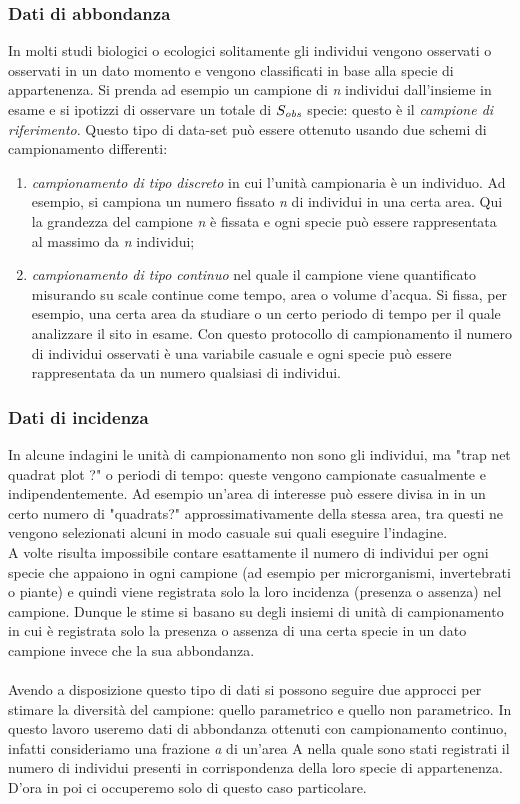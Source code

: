\subsubsection{Dati di abbondanza}
In molti studi biologici o ecologici solitamente gli individui vengono osservati o osservati in un dato momento e vengono classificati in base alla specie di appartenenza. Si prenda ad esempio un campione di \emph{n} individui dall'insieme in esame e si ipotizzi di osservare un totale di $S_\emph{obs}$ specie: questo è il \emph{campione di riferimento}. Questo tipo di data-set può essere ottenuto usando due schemi di campionamento differenti:
\begin{enumerate}
    \item \emph{campionamento di tipo discreto} in cui l'unità campionaria è un individuo. Ad esempio, si campiona un numero fissato \emph{n} di individui in una certa area. Qui la grandezza del campione \emph{n} è fissata e ogni specie può essere rappresentata al massimo da \emph{n} individui;
    
    \item \emph{campionamento di tipo continuo} nel quale il campione viene quantificato misurando su scale continue come tempo, area o volume d'acqua.
    Si fissa, per esempio, una certa area da studiare o un certo periodo di tempo per il quale analizzare il sito in esame. Con questo protocollo di campionamento il numero di individui osservati è una variabile casuale e ogni specie può essere rappresentata da un numero qualsiasi di individui.
\end{enumerate}

\subsubsection{Dati di incidenza}
In alcune indagini le unità di campionamento non sono gli individui, ma "trap net quadrat plot ?" o periodi di tempo: queste vengono campionate casualmente e indipendentemente. Ad esempio un'area di interesse può essere divisa in in un certo numero di "quadrats?" approssimativamente della stessa area, tra questi ne vengono selezionati alcuni in modo casuale sui quali eseguire l'indagine.\\
A volte risulta impossibile contare esattamente il numero di individui per ogni specie che appaiono in ogni campione (ad esempio per microrganismi, invertebrati o piante) e quindi viene registrata solo la loro incidenza (presenza o assenza) nel campione. Dunque le stime si basano su degli insiemi di unità di campionamento in cui è registrata solo la presenza o assenza di una certa specie in un dato campione invece che la sua abbondanza.
\\ \\
Avendo a disposizione questo tipo di dati si possono seguire due approcci per stimare la diversità del campione: quello parametrico e quello non parametrico.
In questo lavoro useremo dati di abbondanza ottenuti con campionamento continuo, infatti consideriamo una frazione \emph{a} di un'area A nella quale sono stati registrati il numero di individui presenti in corrispondenza della loro specie di appartenenza. D'ora in poi ci occuperemo solo di questo caso particolare.


